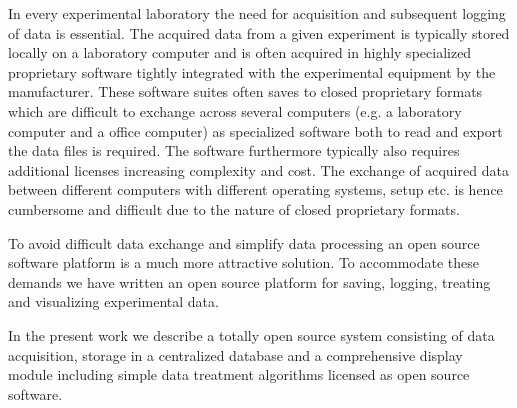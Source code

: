 In every experimental laboratory the need for acquisition and subsequent
logging of data is essential. The acquired data from a given
experiment is typically stored locally on a laboratory computer and is often
acquired in highly specialized proprietary software tightly integrated with the
experimental equipment by the manufacturer. These software suites often saves
to closed proprietary formats which are difficult to exchange across several
computers (e.g. a laboratory computer and a office computer) as specialized
software both to read and export the data files is required. The software
furthermore typically also requires additional licenses increasing complexity
and cost. The exchange of acquired data between different computers with
different operating systems, setup etc. is hence cumbersome and difficult due
to the nature of closed proprietary formats.

To avoid difficult data exchange and simplify data processing
an open source software platform is a much more
attractive solution\cite{Benn2009,Murray2011,So2007}. To accommodate these
demands we have written an open source platform for saving, logging, treating
and visualizing experimental data.

In the present work we describe a totally open source system consisting of data
acquisition, storage in a centralized database and a comprehensive display
module including simple data treatment algorithms licensed as open source
software.
